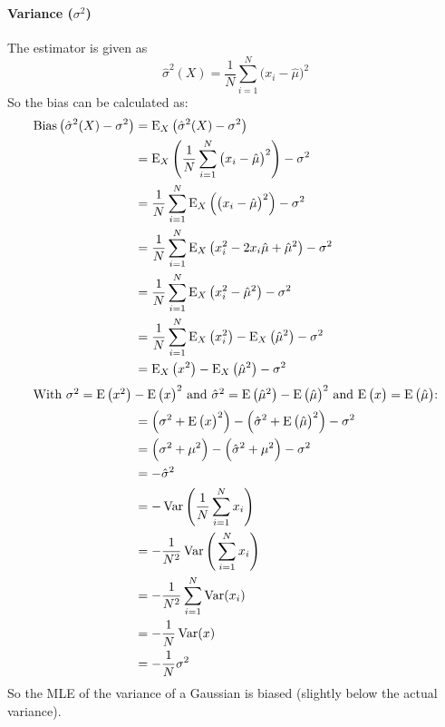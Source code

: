 			\paragraph{Variance (\(\sigma^2\))}
				The estimator is given as
				\begin{equation}
					\hat{\sigma}^2(X) = \frac{1}{N} \sum_{i = 1}^{N} \big(x_i - \hat{\mu}\big)^2
				\end{equation}
				So the bias can be calculated as:
				\begin{align}
					\operatorname{Bias}\big(\hat{\sigma}^2(X) - \sigma^2\big) &= \operatorname{E}_X\big(\hat{\sigma}^2(X) - \sigma^2\big) \\
						&= \operatorname{E}_X\Bigg( \frac{1}{N} \sum_{i = 1}^{N} \big(x_i - \hat{\mu}\big)^2 \Bigg) - \sigma^2 \\
						&= \frac{1}{N} \sum_{i = 1}^{N} \operatorname{E}_X\Big(\big(x_i - \hat{\mu}\big)^2\Big) - \sigma^2 \\
						&= \frac{1}{N} \sum_{i = 1}^{N} \operatorname{E}_X\big( x_i^2 - 2 x_i \hat{\mu} + \hat{\mu}^2 \big) - \sigma^2 \\
						&= \frac{1}{N} \sum_{i = 1}^{N} \operatorname{E}_X\big( x_i^2 - \hat{\mu}^2 \big) - \sigma^2 \\
						&= \frac{1}{N} \sum_{i = 1}^{N} \operatorname{E}_X\big( x_i^2 \big) - \operatorname{E}_X\big( \hat{\mu}^2 \big) - \sigma^2 \\
						&= \operatorname{E}_X\big( x^2 \big) - \operatorname{E}_X\big( \hat{\mu}^2 \big) - \sigma^2 \\
					\intertext{With \( \sigma^2 = \operatorname{E}\big(x^2\big) - \operatorname{E}\big(x\big)^2 \) and \( \hat{\sigma}^2 = \operatorname{E}\big(\hat{\mu}^2\big) - \operatorname{E}\big(\hat{\mu}\big)^2 \) and \( \operatorname{E}\big(x\big) = \operatorname{E}\big(\hat{\mu}\big) \):}
						&= \Big(\sigma^2 + \operatorname{E}\big(x\big)^2\Big) - \Big(\hat{\sigma}^2 + \operatorname{E}\big(\hat{\mu}\big)^2\Big) - \sigma^2 \\
						&= \Big(\sigma^2 + \mu^2\Big) - \Big(\hat{\sigma}^2 + \mu^2\Big) - \sigma^2 \\
						&= -\hat{\sigma}^2 \\
						&= -\operatorname{Var}\Bigg( \frac{1}{N} \sum_{i = 1}^{N} x_i \Bigg) \\
						&= -\frac{1}{N^2} \operatorname{Var}\Bigg( \sum_{i = 1}^{N} x_i \Bigg) \\
						&= -\frac{1}{N^2} \sum_{i = 1}^{N} \operatorname{Var}(x_i) \\
						&= -\frac{1}{N} \operatorname{Var}(x) \\
						&= -\frac{1}{N} \sigma^2
				\end{align}
				So the MLE of the variance of a Gaussian is biased (slightly below the actual variance).

